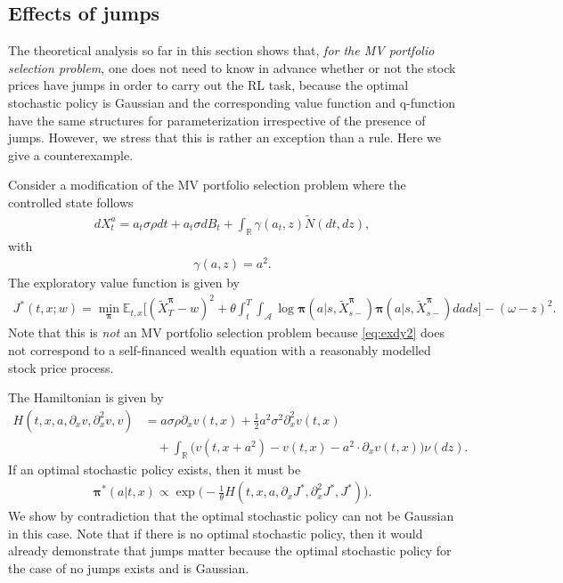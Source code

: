 \documentclass[11pt]{article}
\newcommand{\1}{\mathbbm{1}}
\newcommand{\bpi}{\boldsymbol{\pi}}
\begin{document}
\subsection{Effects of jumps} \label{sec:jump-effect}
The theoretical analysis so far in this section shows that, {\it for the MV portfolio selection problem}, one does not need to know in advance whether or not the stock prices have jumps in order to carry out the RL task, because the optimal stochastic policy is Gaussian and the corresponding value function and q-function have the same structures for parameterization irrespective of the presence of jumps. However, we stress that this is rather an exception than a rule. Here we give a counterexample.


Consider a modification of the MV portfolio selection problem where the controlled state follows
\begin{align} \label{eq:exdy2}
	dX_t^a = a_t \sigma\rho dt + a_t\sigma dB_t + \int_{\mathbb{R}} \gamma(a_t,z)\widetilde{N}(dt, dz),
\end{align}
with
\begin{align} \label{eq:gamma-a2}
	\gamma(a,z) = a^2.
\end{align}
The exploratory value function is given by
\begin{align} \label{eq:exploratory-MV2}
	J^*(t, x; w) =  \min_{\bpi}\mathbb{E}_{t,x}\bigg[ (\tilde{X}_{T}^{\bpi} -w)^2  + \theta  \int_t^T\int_{\mathcal{A}}\log\bpi(a|s, \tilde{X}_{s-}^{\bpi})\bpi(a|s, \tilde{X}_{s-}^{\bpi})dads\bigg] - (\omega-z)^{2}.
\end{align}
Note that this is {\it not} an MV portfolio selection problem because \eqref{eq:exdy2} does not correspond to a self-financed wealth equation with a reasonably modelled stock price process.

The Hamiltonian is given by
\begin{align}\label{eq:HalMV2}
	H(t,x, a,\partial_xv,  \partial_x^2v, v)&= a\sigma\rho \partial_xv(t,x) + \frac{1}{2} a^2\sigma^2 \partial_x^2v(t,x)\\ & \quad +\int_{\mathbb{R}} \big( v(t, x+  a^2) - v(t,x) - a^2 \cdot \partial_xv(t,x) \big) \nu(dz).
\end{align}
If an optimal stochastic policy exists, then it must be
\begin{align} \label{eq:pi-star-MV}
	\boldsymbol{\pi}^*(a| t, x) \propto \exp\bigg(-\frac{1}{\theta} H(t,x, a, \partial_xJ^*,  \partial_x^2J^*, J^*)\bigg).
\end{align}
We show by contradiction that the optimal stochastic policy can not be Gaussian in this case. Note that if there is no optimal stochastic policy, then it would already demonstrate that jumps matter because the optimal stochastic policy for the case of no jumps exists and is Gaussian.
\end{document}
